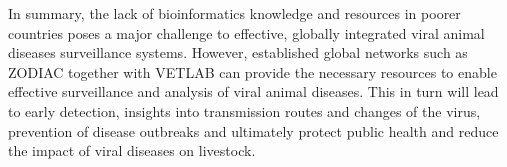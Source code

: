 In summary, the lack of bioinformatics knowledge and resources in poorer countries poses a major challenge to effective, globally integrated viral animal diseases surveillance systems. However, established global networks such as \ac{ZODIAC} together with \ac{VETLAB} can provide the necessary resources to enable effective surveillance and analysis of viral animal diseases. This in turn will lead to early detection, insights into transmission routes and changes of the virus, prevention of disease outbreaks and ultimately protect public health and reduce the impact of viral diseases on livestock.
